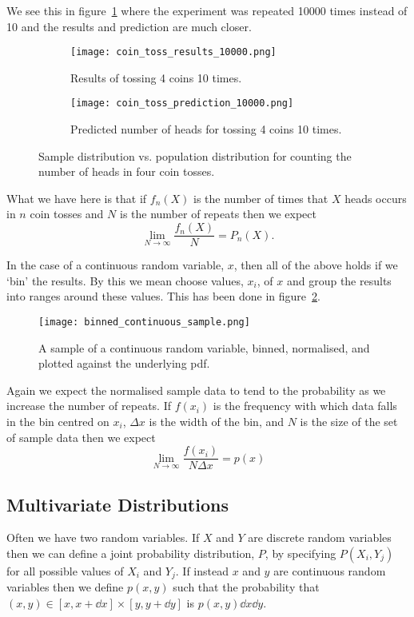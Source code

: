     We see this in figure~\ref{fig:10000 repeats} where the experiment was repeated 10000 times instead of 10 and the results and prediction are much closer.
    \begin{figure}[ht]
        \centering
        \begin{subfigure}{0.35\textwidth}
            \centering
            \texttt{[image: coin\_toss\_results\_10000.png]}
            \caption{Results of tossing 4 coins 10 times.}
        \end{subfigure}
        \begin{subfigure}{0.35\textwidth}
            \centering
            \texttt{[image: coin\_toss\_prediction\_10000.png]}
            \caption{Predicted number of heads for tossing 4 coins 10 times.}
        \end{subfigure}
        \caption{Sample distribution vs. population distribution for counting the number of heads in four coin tosses.}
        \label{fig:10000 repeats}
    \end{figure}
    What we have here is that if \(f_n(X)\) is the number of times that \(X\) heads occurs in \(n\) coin tosses and \(N\) is the number of repeats then we expect
    \[\lim_{N\to\infty} \frac{f_n(X)}{N} = P_n(X).\]
    
    In the case of a continuous random variable, \(x\), then all of the above holds if we `bin' the results.
    By this we mean choose values, \(x_i\), of \(x\) and group the results into ranges around these values.
    This has been done in figure~\ref{fig:binned continuous sample}.
    \begin{figure}[ht]
        \centering
        \texttt{[image: binned\_continuous\_sample.png]}
        \caption{A sample of a continuous random variable, binned, normalised, and plotted against the underlying \acrshort{pdf}.}
        \label{fig:binned continuous sample}
    \end{figure}
    Again we expect the normalised sample data to tend to the probability as we increase the number of repeats.
    If \(f(x_i)\) is the frequency with which data falls in the bin centred on \(x_i\), \(\Delta x\) is the width of the bin, and \(N\) is the size of the set of sample data then we expect
    \[\lim_{N\to\infty} \frac{f(x_i)}{N\Delta x} = p(x)\]
    
    \subsection{Multivariate Distributions}
    Often we have two random variables.
    If \(X\) and \(Y\) are discrete random variables then we can define a joint probability distribution, \(P\), by specifying \(P(X_i, Y_j)\) for all possible values of \(X_i\) and \(Y_j\).
    If instead \(x\) and \(y\) are continuous random variables then we define \(p(x, y)\) such that the probability that \((x, y)\in[x, x + \dd{x}]\times[y, y + \dd{y}]\) is \(p(x, y)\dd{x}\dd{y}\).
    
